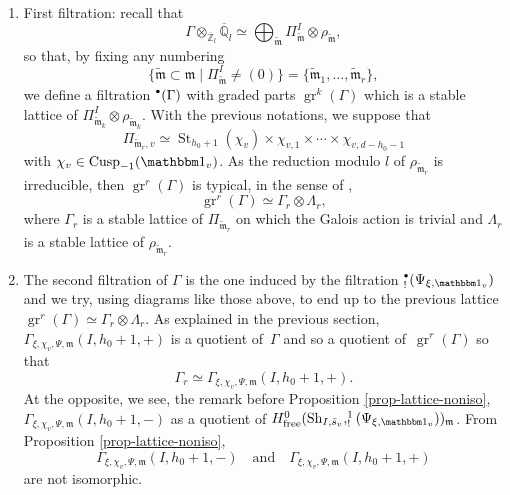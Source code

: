 \documentclass[JEP,XML,SOM,Unicode,published]{cedram}
\let\mathds\mathbbm
\newenvironment{enumeratea}
{\bgroup\def\theenumi{\alph{enumi}}\begin{enumerate}}
{\end{enumerate}\egroup}
\newcommand{\NoChangel}[1]{%
\expandafter\let\csname old\string#1\endcsname=#1
\let#1=\relax
\newcommand{#1}{\mathcode`l="716C\csname old\string#1\endcsname\mathcode`l="7160 }%
}
\let\sep\mid
\newcommand{\sbullet}{{\scriptscriptstyle\bullet}}
\newcommand{\csbullet}{{\raisebox{1pt}{$\sbullet$}}}
\newcommand{\free}{\mathrm{free}}
\theoremstyle{plain}
\theoremstyle{definition}
\numberwithin{equation}{subsection}
\newcommand\Qm{{\mathbb Q}}
\newcommand\Zm{{\mathbb Z}}
\DeclareMathOperator{\sh}{Sh}
\DeclareMathOperator{\cusp}{Cusp}
\DeclareMathOperator{\st}{St}
\DeclareMathOperator{\gr}{gr}
\DeclareMathOperator{\Fil}{Fil}\NoChangel{\Fil}
\begin{document}
\begin{enumeratea}
\item
First filtration:
recall that
\[
\Gamma \otimes_{\overline \Zm_l} \overline \Qm_l \simeq
\bigoplus_{\widetilde{\mathfrak m}} \Pi_{\widetilde{\mathfrak m}}^I \otimes
\rho_{\widetilde{\mathfrak m}},
\]
so that, by fixing any numbering
\[
\{\widetilde{\mathfrak m} \subset \mathfrak m \sep
\Pi_{\widetilde{\mathfrak m}}^I \neq (0)\}=
\{\widetilde{\mathfrak m}_1,\dots, \widetilde{\mathfrak m}_r\},
\]
we define a filtration $\Fil^{\csbullet}(\Gamma)$ with graded parts
$\gr^k(\Gamma)$ which is a stable lattice of
$\Pi^I_{\widetilde{\mathfrak m}_k} \otimes \rho_{\widetilde{\mathfrak m}_k}$.
With the previous notations, we suppose that
\[
\Pi_{\widetilde{\mathfrak m}_r,v}
\simeq \st_{h_0+1}(\chi_v) \times \chi_{v,1} \times \cdots \times \chi_{v,d-h_0-1}
\]
with $\chi_v \in \cusp_{-1}(\mathds 1_v)$. As the reduction modulo $l$ of
$\rho_{\widetilde{\mathfrak m}_r}$ is irreducible, then
$\gr^r(\Gamma)$ is typical, in the sense of \cite[\S5]{scholze-LT}, \ie\[
\gr^r(\Gamma) \simeq \Gamma_r \otimes \Lambda_r,
\]
where $\Gamma_r$ is a stable lattice of $\Pi_{\widetilde{\mathfrak m}_r}$ on
which the Galois action is trivial and $\Lambda_r$ is a stable lattice of
$\rho_{\widetilde{\mathfrak m}_r}$.

\item
The second filtration of $\Gamma$ is the one induced by the filtration
$\Fil^{\csbullet}_!(\Psi_{\xi,\mathds 1_v})$ and we try, using diagrams like those above,
to end up
to the previous lattice $\gr^r(\Gamma) \simeq \Gamma_r \otimes \Lambda_r$.
As explained in the previous section, $\Gamma_{\xi,\chi_v,\Psi,\mathfrak m}
(I,h_0+1,+)$ is a quotient of~$\Gamma$ and so a quotient of~$\gr^r(\Gamma)$
so that
\[
\Gamma_r \simeq \Gamma_{\xi,\chi_v,\Psi,\mathfrak m} (I,h_0+1,+).
\]
At the opposite, we see, \cf the remark before Proposition \ref{prop-lattice-noniso},
$\Gamma_{\xi,\chi_v,\Psi,\mathfrak m} (I,h_0+1,-)$
as a quotient of
$H^0_{\free}(\sh_{I,\bar s_v},\Fil^1_!(\Psi_{\xi,\mathds 1_v}))_{\mathfrak m}$.
From Proposition \ref{prop-lattice-noniso},
\[
\Gamma_{\xi,\chi_v,\Psi,\mathfrak m} (I,h_0+1,-)\quad\text{and}\quad\Gamma_{\xi,\chi_v,\Psi,\mathfrak m} (I,h_0+1,+)
\]
are not isomorphic.


\end{enumeratea}
\end{document}
